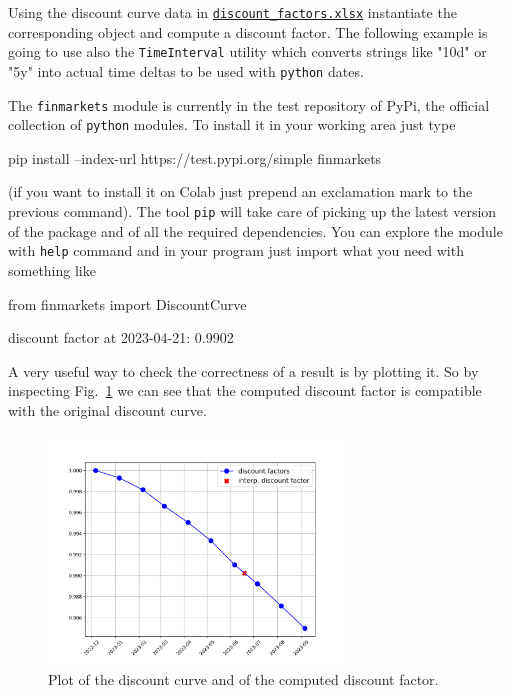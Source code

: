 
Using the discount curve data in \href{https://github.com/matteosan1/finance_course/raw/master/input_files/discount_factors_2022-10-05.xlsx}{\texttt{discount\_factors.xlsx}} instantiate the corresponding object and compute a discount factor.
The following example is going to use also the \texttt{TimeInterval} utility which converts strings like "10d" or "5y" into actual time deltas to be used with \texttt{python} dates.

\begin{finmarkets}
The \texttt{finmarkets} module is currently in the test repository of PyPi, the official collection of \texttt{python} modules. 
To install it in your working area just type 

\begin{ioutput}
pip install --index-url https://test.pypi.org/simple finmarkets
\end{ioutput}

(if you want to install it on Colab just prepend an exclamation mark to the previous command). The tool \texttt{pip} will take care of picking up the latest version of the package and of all the required dependencies. You can explore the module with \texttt{help} command and in your program just import what you need with something like

\begin{ipythonnon}
from finmarkets import DiscountCurve
\end{ipythonnon}
\end{finmarkets}


\begin{ioutput}
discount factor at 2023-04-21: 0.9902
\end{ioutput}

A very useful way to check the correctness of a result is by plotting it. So by inspecting Fig.~\ref{fig:linear_discount_curve} we can see that the computed discount factor is compatible with the original discount curve.

\begin{figure}[htb]
	\centering
	\includegraphics[width=0.7\textwidth]{figures/linear_discount_curve}
	\caption{Plot of the discount curve and of the computed discount factor.}
	\label{fig:linear_discount_curve}
\end{figure}

